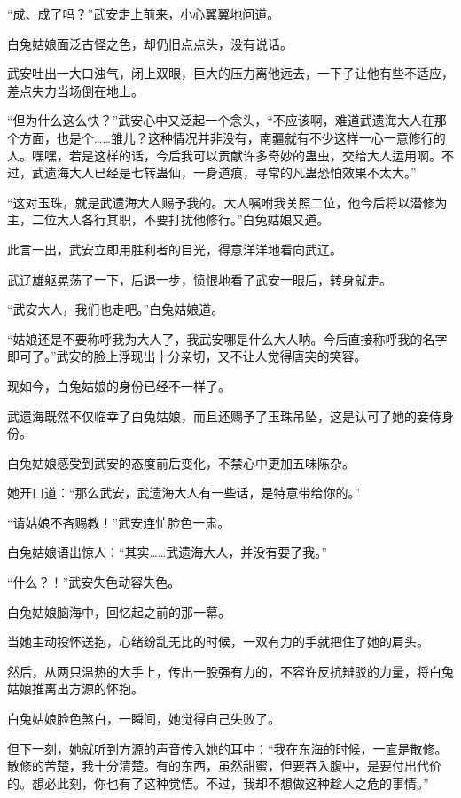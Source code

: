 \begin{this_body}
“成、成了吗？”武安走上前来，小心翼翼地问道。

白兔姑娘面泛古怪之色，却仍旧点点头，没有说话。

武安吐出一大口浊气，闭上双眼，巨大的压力离他远去，一下子让他有些不适应，差点失力当场倒在地上。

“但为什么这么快？”武安心中又泛起一个念头，“不应该啊，难道武遗海大人在那个方面，也是个……雏儿？这种情况并非没有，南疆就有不少这样一心一意修行的人。嘿嘿，若是这样的话，今后我可以贡献许多奇妙的蛊虫，交给大人运用啊。不过，武遗海大人已经是七转蛊仙，一身道痕，寻常的凡蛊恐怕效果不太大。”

“这对玉珠，就是武遗海大人赐予我的。大人嘱咐我关照二位，他今后将以潜修为主，二位大人各行其职，不要打扰他修行。”白兔姑娘又道。

此言一出，武安立即用胜利者的目光，得意洋洋地看向武辽。

武辽雄躯晃荡了一下，后退一步，愤恨地看了武安一眼后，转身就走。

“武安大人，我们也走吧。”白兔姑娘道。

“姑娘还是不要称呼我为大人了，我武安哪是什么大人呐。今后直接称呼我的名字即可了。”武安的脸上浮现出十分亲切，又不让人觉得唐突的笑容。

现如今，白兔姑娘的身份已经不一样了。

武遗海既然不仅临幸了白兔姑娘，而且还赐予了玉珠吊坠，这是认可了她的妾侍身份。

白兔姑娘感受到武安的态度前后变化，不禁心中更加五味陈杂。

她开口道：“那么武安，武遗海大人有一些话，是特意带给你的。”

“请姑娘不吝赐教！”武安连忙脸色一肃。

白兔姑娘语出惊人：“其实……武遗海大人，并没有要了我。”

“什么？！”武安失色动容失色。

白兔姑娘脑海中，回忆起之前的那一幕。

当她主动投怀送抱，心绪纷乱无比的时候，一双有力的手就把住了她的肩头。

然后，从两只温热的大手上，传出一股强有力的，不容许反抗辩驳的力量，将白兔姑娘推离出方源的怀抱。

白兔姑娘脸色煞白，一瞬间，她觉得自己失败了。

但下一刻，她就听到方源的声音传入她的耳中：“我在东海的时候，一直是散修。散修的苦楚，我十分清楚。有的东西，虽然甜蜜，但要吞入腹中，是要付出代价的。想必此刻，你也有了这种觉悟。不过，我却不想做这种趁人之危的事情。”


\end{this_body}
